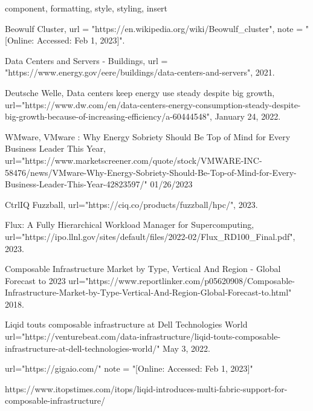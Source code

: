 \documentclass[conference]{IEEEtran}
\begin{document}
\begin{IEEEkeywords}
component, formatting, style, styling, insert
\end{IEEEkeywords}







%

\begin{thebibliography}{20}

  Beowulf Cluster,
  url = "https://en.wikipedia.org/wiki/Beowulf_cluster",
  note = "[Online: Accessed: Feb 1, 2023]".

  Data Centers and Servers - Buildings,
  url = "https://www.energy.gov/eere/buildings/data-centers-and-servers",
  2021.
  
  Deutsche Welle,
  Data centers keep energy use steady despite big growth,
  url="https://www.dw.com/en/data-centers-energy-consumption-steady-despite-big-growth-because-of-increasing-efficiency/a-60444548",
  January 24, 2022.
  
  WMware,
  VMware : Why Energy Sobriety Should Be Top of Mind for Every Business Leader This Year,
  url="https://www.marketscreener.com/quote/stock/VMWARE-INC-58476/news/VMware-Why-Energy-Sobriety-Should-Be-Top-of-Mind-for-Every-Business-Leader-This-Year-42823597/"
  01/26/2023
  
  CtrlIQ Fuzzball,
  url="https://ciq.co/products/fuzzball/hpc/",
  2023.
  
  Flux:  A Fully Hierarchical Workload Manager for Supercomputing,
  url="https://ipo.llnl.gov/sites/default/files/2022-02/Flux_RD100_Final.pdf",
  2023. 
  
  Composable Infrastructure Market by Type, Vertical And Region - Global Forecast to 2023
  url="https://www.reportlinker.com/p05620908/Composable-Infrastructure-Market-by-Type-Vertical-And-Region-Global-Forecast-to.html"
  2018.
  
  Liqid touts composable infrastructure at Dell Technologies World
  url="https://venturebeat.com/data-infrastructure/liqid-touts-composable-infrastructure-at-dell-technologies-world/"
  May 3, 2022.
  
  url="https://gigaio.com/"
  note = "[Online: Accessed: Feb 1, 2023]"  

https://www.itopstimes.com/itops/liqid-introduces-multi-fabric-support-for-composable-infrastructure/


\end{thebibliography}
\end{document}
